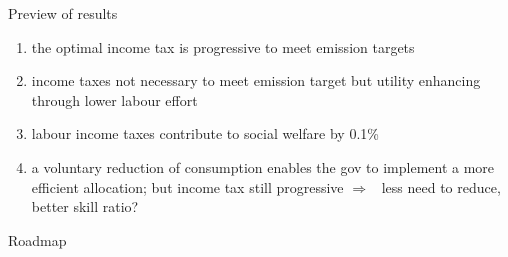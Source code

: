 \documentclass[11pt,aspectratio=169]{beamer}
\newcommand{\ar}{$\Rightarrow$ \ }
\begin{document}

\begin{frame}{Preview of results}
\begin{enumerate}
	\item<+-> the optimal income tax is progressive  to meet emission targets
		\vspace{3mm}
		\item<+-> income taxes not necessary to meet emission target but utility enhancing through lower labour effort
		\vspace{3mm}
	\item<+-> labour income taxes contribute to social welfare by 0.1\% %
	
	\vspace{3mm}
	\item<+-> a voluntary reduction of consumption enables the gov to implement a more efficient allocation; but income tax still progressive \ar less need to reduce, better skill ratio?
\end{enumerate}
\end{frame}
\begin{frame}{Roadmap}
	\tableofcontents
\end{frame}
\end{document}
